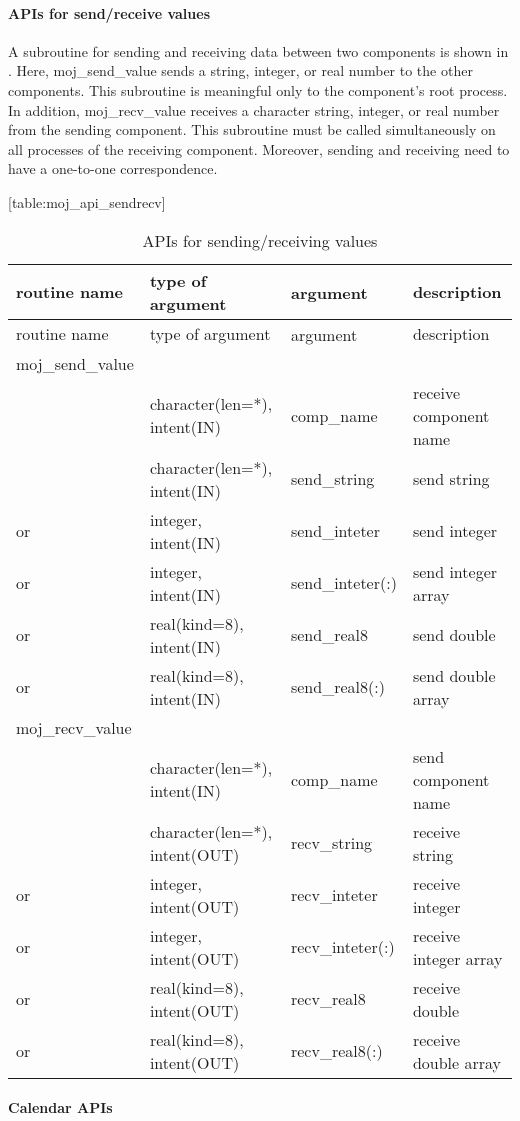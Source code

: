 \hypertarget{apis-for-sendreceive-values}{%
\paragraph{APIs for send/receive
values}\label{apis-for-sendreceive-values}}

A subroutine for sending and receiving data between two components is
shown in . Here, moj\_send\_value sends a string, integer, or real
number to the other components. This subroutine is meaningful only to
the component's root process. In addition, moj\_recv\_value receives a
character string, integer, or real number from the sending component.
This subroutine must be called simultaneously on all processes of the
receiving component. Moreover, sending and receiving need to have a
one-to-one correspondence.

\protect\hypertarget{table:moj_api_sendrecv}{}{{[}table:moj\_api\_sendrecv{]}}

\hypertarget{table:moj_api_sendrecv}{}
\begin{longtable}[]{@{}llll@{}}
\caption{APIs for sending/receiving values}\tabularnewline
\toprule
routine name & type of argument & argument　 &
description\tabularnewline
\midrule
\endfirsthead
\toprule
routine name & type of argument & argument　 &
description\tabularnewline
\midrule
\endhead
moj\_send\_value & & &\tabularnewline
& character(len=*), intent(IN) & comp\_name & receive component
name\tabularnewline
& character(len=*), intent(IN) & send\_string & send
string\tabularnewline
or & integer, intent(IN) & send\_inteter & send integer\tabularnewline
or & integer, intent(IN) & send\_inteter(:) & send integer
array\tabularnewline
or & real(kind=8), intent(IN) & send\_real8 & send double\tabularnewline
or & real(kind=8), intent(IN) & send\_real8(:) & send double
array\tabularnewline
moj\_recv\_value & & &\tabularnewline
& character(len=*), intent(IN) & comp\_name & send component
name\tabularnewline
& character(len=*), intent(OUT) & recv\_string & receive
string\tabularnewline
or & integer, intent(OUT) & recv\_inteter & receive
integer\tabularnewline
or & integer, intent(OUT) & recv\_inteter(:) & receive integer
array\tabularnewline
or & real(kind=8), intent(OUT) & recv\_real8 & receive
double\tabularnewline
or & real(kind=8), intent(OUT) & recv\_real8(:) & receive double
array\tabularnewline
\bottomrule
\end{longtable}

\hypertarget{calendar-apis}{%
\paragraph{Calendar APIs}\label{calendar-apis}}

